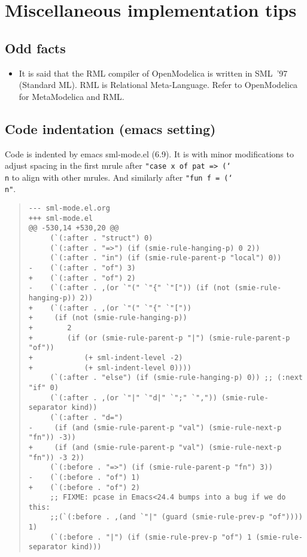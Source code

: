 \documentclass[10pt,b5paper]{article}
\begin{document}

\section{Miscellaneous implementation tips}

\subsection{Odd facts}

\begin{itemize}

\item It is said that the RML compiler of OpenModelica is written in
SML~'97 (Standard ML).  RML is Relational Meta-Language.  Refer to
OpenModelica for MetaModelica and RML.

\end{itemize}

\subsection{Code indentation (emacs setting)}

Code is indented by emacs sml-mode.el (6.9).  It is with minor
modifications to adjust spacing in the first mrule after
{\tt{}"case~x~of~pat~=>~({\char`\\}n} to align with other mrules.  And
similarly after {\tt{}"fun~f~=~({\char`\\}n"}.

\begin{quote}
\small
\begin{lstlisting}[aboveskip=-\baselineskip]
--- sml-mode.el.org
+++ sml-mode.el
@@ -530,14 +530,20 @@
     (`(:after . "struct") 0)
     (`(:after . "=>") (if (smie-rule-hanging-p) 0 2))
     (`(:after . "in") (if (smie-rule-parent-p "local") 0))
-    (`(:after . "of") 3)
+    (`(:after . "of") 2)
-    (`(:after . ,(or `"(" `"{" `"[")) (if (not (smie-rule-hanging-p)) 2))
+    (`(:after . ,(or `"(" `"{" `"["))
+     (if (not (smie-rule-hanging-p))
+        2
+        (if (or (smie-rule-parent-p "|") (smie-rule-parent-p "of"))
+            (+ sml-indent-level -2)
+            (+ sml-indent-level 0))))
     (`(:after . "else") (if (smie-rule-hanging-p) 0)) ;; (:next "if" 0)
     (`(:after . ,(or `"|" `"d|" `";" `",")) (smie-rule-separator kind))
     (`(:after . "d=")
-     (if (and (smie-rule-parent-p "val") (smie-rule-next-p "fn")) -3))
+     (if (and (smie-rule-parent-p "val") (smie-rule-next-p "fn")) -3 2))
     (`(:before . "=>") (if (smie-rule-parent-p "fn") 3))
-    (`(:before . "of") 1)
+    (`(:before . "of") 2)
     ;; FIXME: pcase in Emacs<24.4 bumps into a bug if we do this:
     ;;(`(:before . ,(and `"|" (guard (smie-rule-prev-p "of")))) 1)
     (`(:before . "|") (if (smie-rule-prev-p "of") 1 (smie-rule-separator kind)))
\end{lstlisting}
\end{quote}
\end{document}
